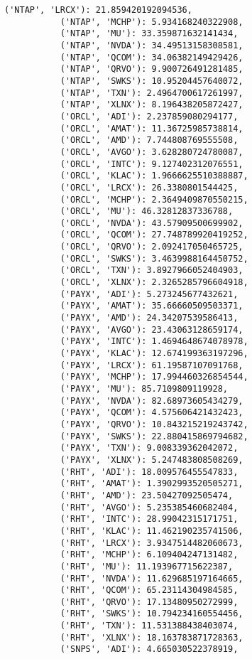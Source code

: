 \documentclass[11pt]{article}
\begin{document}
\begin{Verbatim}[commandchars=\\\{\}]
           ('NTAP', 'LRCX'): 21.859420192094536,
           ('NTAP', 'MCHP'): 5.934168240322908,
           ('NTAP', 'MU'): 33.359871632141434,
           ('NTAP', 'NVDA'): 34.49513158308581,
           ('NTAP', 'QCOM'): 34.06382149429426,
           ('NTAP', 'QRVO'): 9.900726491281485,
           ('NTAP', 'SWKS'): 10.95204457640072,
           ('NTAP', 'TXN'): 2.4964700617261997,
           ('NTAP', 'XLNX'): 8.196438205872427,
           ('ORCL', 'ADI'): 2.237859080294177,
           ('ORCL', 'AMAT'): 11.36725985738814,
           ('ORCL', 'AMD'): 7.744808769555508,
           ('ORCL', 'AVGO'): 3.628280724780087,
           ('ORCL', 'INTC'): 9.127402312076551,
           ('ORCL', 'KLAC'): 1.9666625510388887,
           ('ORCL', 'LRCX'): 26.3380801544425,
           ('ORCL', 'MCHP'): 2.3649409870550215,
           ('ORCL', 'MU'): 46.32812837336788,
           ('ORCL', 'NVDA'): 43.57909500699902,
           ('ORCL', 'QCOM'): 27.748789920419252,
           ('ORCL', 'QRVO'): 2.092417050465725,
           ('ORCL', 'SWKS'): 3.4639988164450752,
           ('ORCL', 'TXN'): 3.8927966052404903,
           ('ORCL', 'XLNX'): 2.3265285796604918,
           ('PAYX', 'ADI'): 5.273245677432621,
           ('PAYX', 'AMAT'): 35.66660509503371,
           ('PAYX', 'AMD'): 24.34207539586413,
           ('PAYX', 'AVGO'): 23.43063128659174,
           ('PAYX', 'INTC'): 1.4694648674078978,
           ('PAYX', 'KLAC'): 12.674199363197296,
           ('PAYX', 'LRCX'): 61.19587107091768,
           ('PAYX', 'MCHP'): 17.994460326854544,
           ('PAYX', 'MU'): 85.7109809119928,
           ('PAYX', 'NVDA'): 82.68973605434279,
           ('PAYX', 'QCOM'): 4.575606421432423,
           ('PAYX', 'QRVO'): 10.843215219243742,
           ('PAYX', 'SWKS'): 22.880415869794682,
           ('PAYX', 'TXN'): 9.008339362042072,
           ('PAYX', 'XLNX'): 5.247483808508269,
           ('RHT', 'ADI'): 18.009576455547833,
           ('RHT', 'AMAT'): 1.3902993520505271,
           ('RHT', 'AMD'): 23.50427092505474,
           ('RHT', 'AVGO'): 5.235385460682404,
           ('RHT', 'INTC'): 28.99042315171751,
           ('RHT', 'KLAC'): 11.462190235741506,
           ('RHT', 'LRCX'): 3.9347514482060673,
           ('RHT', 'MCHP'): 6.109404247131482,
           ('RHT', 'MU'): 11.193967715622387,
           ('RHT', 'NVDA'): 11.629685197164665,
           ('RHT', 'QCOM'): 65.23114304984585,
           ('RHT', 'QRVO'): 17.13480950272999,
           ('RHT', 'SWKS'): 10.794234160554456,
           ('RHT', 'TXN'): 11.531388438403074,
           ('RHT', 'XLNX'): 18.163783871728363,
           ('SNPS', 'ADI'): 4.665030522378919,

\end{Verbatim}
\end{document}
